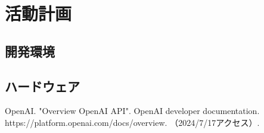 \documentclass[12pt,a4paper]{report}
\begin{document}
\section{活動計画}\noindent
\subsection{開発環境}
\noindent\space

\subsection{ハードウェア}
\noindent\space

\begin{thebibliography}{1}
   OpenAI. "Overview OpenAI API". OpenAI developer documentation. https://platform.openai.com/docs/overview. （2024/7/17アクセス）.
\end{thebibliography}
\end{document}
